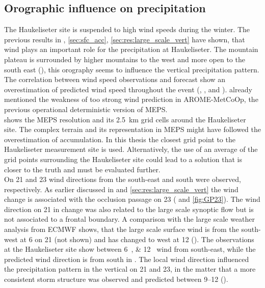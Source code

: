 \subsection{Orographic influence on precipitation}\label{sec:res:oro_infl}
The Haukeliseter site is suspended to high wind speeds during the winter. The previous results in , \ref{sec:sfc_acc}, \ref{sec:res:large_scale_vert} have shown, that wind plays an important role for the precipitation at Haukeliseter. The mountain plateau is surrounded by higher mountains to the west and more open to the south east (), this orography seems to influence the vertical precipitation pattern. The correlation between wind speed observations and forecast show an overestimation of predicted wind speed throughout the event (, ,  and ). \citet{muller_arome-metcoop:_2017} already mentioned the weakness of too strong wind prediction in AROME-MetCoOp, the previous operational deterministic version of MEPS.
\\
 shows the MEPS resolution and its \SI{2.5}{\km} grid cells around the Haukeliseter site. 
The complex terrain and its representation in MEPS might have followed the overestimation of accumulation. In this thesis the closest grid point to the Haukeliseter measurement site is used. Alternatively, the use of an average of the grid points surrounding the Haukeliseter site could lead to a solution that is closer to the truth and must be evaluated further.
\\
On \num{21} and \SI{23}{\dec} wind directions from the south-east and south were observed, respectively. As earlier discussed in and \ref{sec:res:large_scale_vert} the wind change is associated with the occlusion passage on \SI{23}{\dec} ( and \ref{fig:GP23}). 
The wind direction on \SI{21}{\dec} in  change was also related to the large scale synoptic flow but is not associated to a frontal boundary. A comparison with the large scale weather analysis from ECMWF shows, that the large scale surface wind is from the south-west at \SI{6}{\UTC} on \SI{21}{\dec} (not shown) and has changed to west at \SI{12}{\UTC} (). The observations at the Haukeliseter site show between \SIlist{6;12}{\UTC} wind from south-east, while the predicted wind direction is from south in . The local wind direction influenced the precipitation pattern in the vertical on \num{21} and \SI{23}{\dec}, in the matter that a more consistent storm structure was observed and predicted between \SIrange{9}{12} {\UTC} (). 
